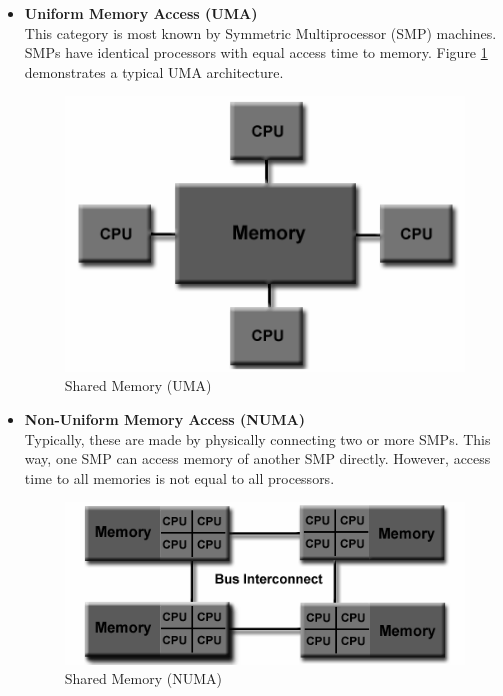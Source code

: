 \begin{itemize}
\item \textbf{Uniform Memory Access (UMA)}\\
  This category is most known by Symmetric Multiprocessor (SMP) machines. SMPs have identical processors with equal access time to memory. Figure \ref{fig:shared_memory_UMA} demonstrates a typical UMA architecture.\\

  \begin{figure}[ht]
    \centering
    \includegraphics[scale=0.6]{images/shared_mem.png}
    \caption{Shared Memory (UMA)}
    \label{fig:shared_memory_UMA}
  \end{figure}

\item \textbf{Non-Uniform Memory Access (NUMA)}\\
  Typically, these are made by physically connecting two or more SMPs. This way, one SMP can access memory of another SMP directly. However, access time to all memories is not equal to all processors.
  
  \begin{figure}[ht]
    \centering
    \includegraphics[scale=0.6]{images/numa.png}
    \caption{Shared Memory (NUMA)}
    \label{fig:shared_memory_NUMA}
  \end{figure}

\end{itemize}

